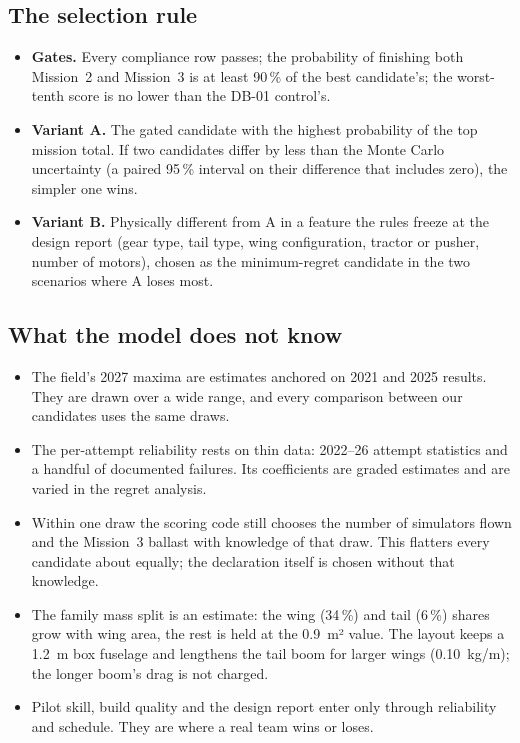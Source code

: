 \subsection{The selection rule}\label{sec:rule}
\begin{itemize}
\item \textbf{Gates.} Every compliance row passes; the probability of finishing both Mission~2 and Mission~3 is at least 90\,\% of the best candidate's; the worst-tenth score is no lower than the DB-01 control's.
\item \textbf{Variant A.} The gated candidate with the highest probability of the top mission total. If two candidates differ by less than the Monte Carlo uncertainty (a paired 95\,\% interval on their difference that includes zero), the simpler one wins.
\item \textbf{Variant B.} Physically different from A in a feature the rules freeze at the design report (gear type, tail type, wing configuration, tractor or pusher, number of motors), chosen as the minimum-regret candidate in the two scenarios where A loses most.
\end{itemize}

\subsection{What the model does not know}
\begin{itemize}
\item The field's 2027 maxima are estimates anchored on 2021 and 2025 results. They are drawn over a wide range, and every comparison between our candidates uses the same draws.
\item The per-attempt reliability rests on thin data: 2022--26 attempt statistics and a handful of documented failures. Its coefficients are graded estimates and are varied in the regret analysis.
\item Within one draw the scoring code still chooses the number of simulators flown and the Mission~3 ballast with knowledge of that draw. This flatters every candidate about equally; the declaration itself is chosen without that knowledge.
\item The family mass split is an estimate: the wing (34\,\%) and tail (6\,\%) shares grow with wing area, the rest is held at the 0.9~m² value. The layout keeps a 1.2~m box fuselage and lengthens the tail boom for larger wings (0.10~kg/m); the longer boom's drag is not charged.
\item Pilot skill, build quality and the design report enter only through reliability and schedule. They are where a real team wins or loses.
\end{itemize}

